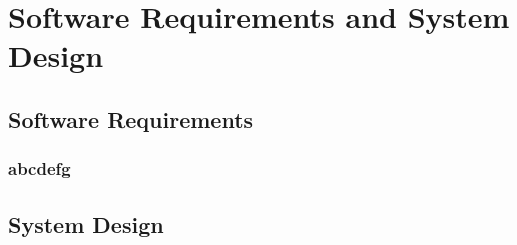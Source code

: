 \chapter{Software Requirements and System Design}
\label{chapter3}

\section{Software Requirements}

\subsection{abcdefg}

\section{System Design}